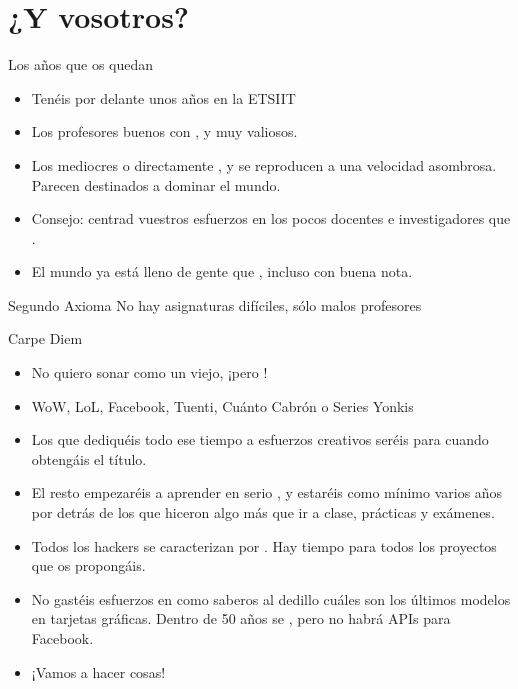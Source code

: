 \documentclass[14pt]{beamer}
\begin{document}
\section{¿Y vosotros?}
\begin{frame}{Los años que os quedan}
  \begin{itemize}
    \item Tenéis por delante unos años  en la ETSIIT
    \item Los profesores buenos con , y muy valiosos.
    \item Los mediocres o directamente , y
      se reproducen a una velocidad asombrosa. Parecen destinados a
      dominar el mundo.
    \item Consejo: centrad vuestros esfuerzos en los pocos docentes e
      investigadores que .
    \item El mundo ya está lleno de gente que , incluso con buena nota.
  \end{itemize}

  \begin{alertblock}{\centering Segundo Axioma}
    \centering No hay asignaturas difíciles, sólo malos profesores
  \end{alertblock}
\end{frame}

\begin{frame}{Carpe Diem}
  \begin{itemize}
    \item No quiero sonar como un viejo, ¡pero !
    \item WoW, LoL, Facebook, Tuenti, Cuánto Cabrón o Series Yonkis
    \item Los que dediquéis todo ese tiempo a esfuerzos creativos
      seréis  para
      cuando obtengáis el título.
    \item El resto empezaréis a aprender en serio , y estaréis como mínimo varios años por detrás de los
      que hiceron algo más que ir a clase, prácticas y exámenes.
    \item Todos los hackers se caracterizan por . Hay tiempo para todos los proyectos que os
      propongáis.
    \item No gastéis esfuerzos en 
      como saberos al dedillo cuáles son los últimos modelos en
      tarjetas gráficas. Dentro de 50 años se , pero no habrá APIs para Facebook.
    \item ¡Vamos a hacer cosas!
  \end{itemize}
\end{frame}
\end{document}
